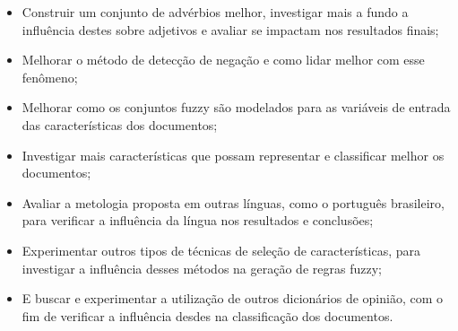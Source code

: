 \documentclass[template.tex]{subfiles}
\begin{document}
\begin{itemize}
\item Construir um conjunto de advérbios melhor, investigar mais a fundo a influência destes sobre adjetivos e avaliar se impactam nos resultados finais;
\item Melhorar o método de detecção de negação e como lidar melhor com esse fenômeno;
\item Melhorar como os conjuntos fuzzy são modelados para as variáveis de entrada das características dos documentos;
\item Investigar mais características que possam representar e classificar melhor os documentos;
\item Avaliar a metologia proposta em outras línguas, como o português brasileiro, para verificar a influência da língua nos resultados e conclusões;
\item Experimentar outros tipos de técnicas de seleção de características, para investigar a influência desses métodos na geração de regras fuzzy;
\item E buscar e experimentar a utilização de outros dicionários de opinião, com o fim de verificar a influência desdes na classificação dos documentos.
\end{itemize}

\end{document}
